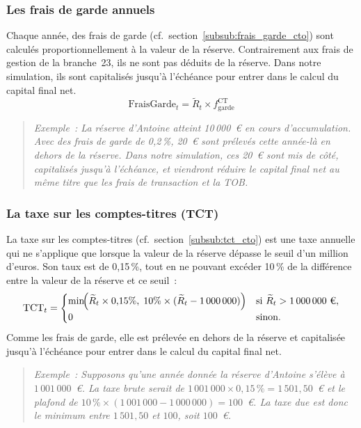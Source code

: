 ﻿\documentclass[12pt, a4paper]{article}
\begin{document}
\subsubsection*{Les frais de garde annuels}
\label{sub:frais_garde_ct}

Chaque année, des frais de garde (cf.~section~\ref{subsub:frais_garde_cto}) sont calculés proportionnellement à la valeur
de la réserve. Contrairement aux frais de gestion de la branche~23, ils ne sont
pas déduits de la réserve. Dans notre simulation, ils sont 
capitalisés jusqu'à l'échéance pour entrer dans le
calcul du capital final net.
\begin{equation}
  \text{FraisGarde}_t = \widetilde{R}_t \times f_{\text{garde}}^{\text{CT}}
\end{equation}

\begin{quote}
\textit{Exemple~: La réserve d'Antoine atteint 10\,000~€ en cours d'accumulation.
Avec des frais de garde de 0{,}2\,\%, 20~€ sont prélevés cette année-là en dehors
de la réserve. Dans notre simulation, ces 20~€ sont mis de côté, capitalisés jusqu'à l'échéance, et
viendront réduire le capital final net au même titre que les frais de transaction et la TOB.}
\end{quote}

\subsubsection*{La taxe sur les comptes-titres (TCT)}
\label{sub:tct_ct}

La taxe sur les comptes-titres (cf.~section~\ref{subsub:tct_cto}) est une taxe annuelle qui ne s'applique que
lorsque la valeur de la réserve dépasse le seuil d'un million d'euros. Son
taux est de 0{,}15\,\%, tout en ne pouvant excéder 10\,\% de la différence
entre la valeur de la réserve et ce seuil~:
\begin{equation}
  \text{TCT}_t =
  \begin{cases}
    \min\!\Bigl(\widetilde{R}_t \times 0{,}15\%,\; 10\% \times (\widetilde{R}_t - 1\,000\,000)\Bigr)
      & \text{si } \widetilde{R}_t > 1\,000\,000~\text{€}, \\
    0
      & \text{sinon.}
  \end{cases}
\end{equation}
Comme les frais de garde, elle est prélevée en dehors de la réserve et
capitalisée jusqu'à l'échéance pour entrer dans le calcul du capital final net.

\begin{quote}
\textit{Exemple~: Supposons qu'une année donnée la réserve d'Antoine s'élève
à $1\,001\,000$~€. La taxe brute serait de $1\,001\,000 \times 0{,}15\,\% =
1\,501{,}50$~€ et le plafond de $10\,\% \times (1\,001\,000 - 1\,000\,000) = 100$~€.
La taxe due est donc le minimum entre $1\,501{,}50$ et $100$, soit $100$~€.}
\end{quote}
\end{document}
